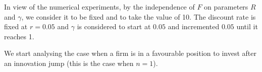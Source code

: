 In view of the numerical experiments, by the independence of $F$ on parameters $R$ and $\gamma$, we consider it to be fixed and to take the value of 10. The discount rate is fixed at $r=0.05$ and $\gamma$ is considered to start at $0.05$ and incremented $0.05$ until it reaches 1.




We start analysing the case when a firm is in a favourable position to invest after an innovation jump (this is the case when $n=1$).

